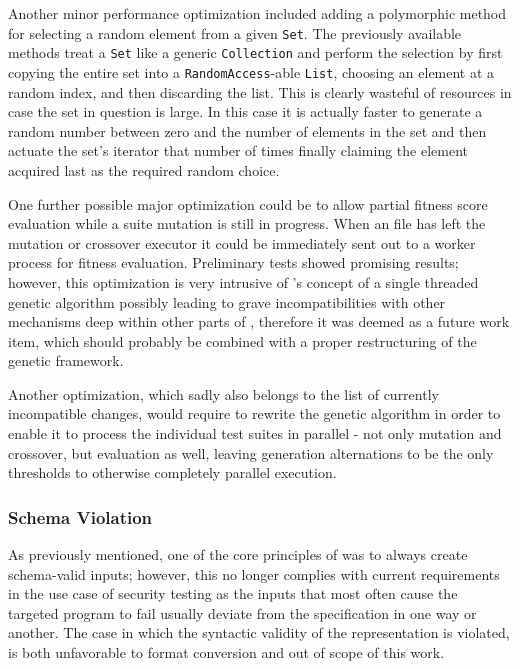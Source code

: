 Another minor performance optimization included adding a polymorphic method for selecting a random 
element from a given \texttt{Set}. The previously available methods treat a \texttt{Set} like a 
generic \texttt{Collection} and perform the selection by first copying the entire set into a 
\texttt{RandomAccess}-able \texttt{List}, choosing an element at a random index, and then discarding the list.
This is clearly wasteful of resources in case the set in question is large. In this case it is actually faster
to generate a random number between zero and the number of elements in the set and then actuate the set's
iterator that number of times finally claiming the element acquired last as the required random choice.

One further possible major optimization could be to allow partial fitness score evaluation while a suite 
mutation is still in progress. When an \xml file has left the mutation or crossover executor it could be 
immediately sent out to a worker process for fitness evaluation. Preliminary tests showed promising 
results; however, this optimization is very intrusive of \evosuite's concept of a single threaded 
genetic algorithm possibly leading to grave incompatibilities with other mechanisms deep within other parts 
of \evosuite, therefore it was deemed as a future work item, which should probably be combined with a 
proper restructuring of the genetic framework.

Another optimization, which sadly also belongs to the list of currently incompatible changes, would require to
rewrite the genetic algorithm in order to enable it to process the individual test suites in parallel -
not only mutation and crossover, but evaluation as well, leaving generation alternations to be the only
thresholds to otherwise completely parallel execution.
\subsubsection{Schema Violation}
\label{sec:local}
As previously mentioned, one of the core principles of \xmlmate was to always create schema-valid inputs; 
however, this no longer complies with current requirements in the use case of security testing as the 
inputs that most often cause the targeted program to fail usually deviate from the specification in 
one way or another. The case in which the syntactic validity of the \xml representation is violated, is 
both unfavorable to format conversion and out of scope of this work.

